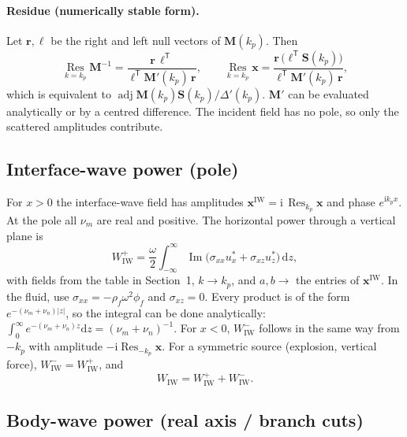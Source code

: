\documentclass[11pt,a4paper]{article}
\newcommand{\ii}{\mathrm{i}}
\newcommand{\dd}{\mathrm{d}}
\newcommand{\Res}{\operatorname*{Res}}
\newcommand{\IM}{\operatorname{Im}}
\begin{document}
\paragraph{Residue (numerically stable form).} Let $\mathbf r,\bm\ell$ be the right and left null
vectors of $\mathbf M(k_p)$. Then
\begin{equation}
  \Res_{k=k_p}\mathbf M^{-1}=\frac{\mathbf r\,\bm\ell^{\mathsf T}}{\bm\ell^{\mathsf T}\mathbf M'(k_p)\,\mathbf r},
  \qquad
  \Res_{k=k_p}\mathbf x=\frac{\mathbf r\,\bigl(\bm\ell^{\mathsf T}\mathbf S(k_p)\bigr)}{\bm\ell^{\mathsf T}\mathbf M'(k_p)\,\mathbf r},
  \label{eq:res}
\end{equation}
which is equivalent to $\operatorname{adj}\mathbf M(k_p)\mathbf S(k_p)/\Delta'(k_p)$. $\mathbf M'$ can be
evaluated analytically or by a centred difference. The incident field has no pole, so only the
scattered amplitudes contribute.

\subsection{Interface-wave power (pole)}

For $x>0$ the interface-wave field has amplitudes
$\mathbf x^{\mathrm{IW}}=\ii\,\Res_{k_p}\mathbf x$ and phase $e^{\ii k_px}$. At the pole all $\nu_m$
are real and positive. The horizontal power through a vertical plane is
\begin{equation}
  W_{\mathrm{IW}}^{+}=\frac{\omega}{2}\int_{-\infty}^{\infty}
  \IM\bigl(\sigma_{xx}u_x^{*}+\sigma_{xz}u_z^{*}\bigr)\,\dd z ,
  \label{eq:WIW}
\end{equation}
with fields from the table in Section~1, $k\to k_p$, and $a,b\to$ the entries of
$\mathbf x^{\mathrm{IW}}$. In the fluid, use $\sigma_{xx}=-\rho_f\omega^2\phi_f$ and
$\sigma_{xz}=0$. Every product is of the form $e^{-(\nu_m+\nu_n)|z|}$, so the integral can be done
analytically: $\int_0^\infty e^{-(\nu_m+\nu_n)z}\dd z=(\nu_m+\nu_n)^{-1}$. For $x<0$,
$W_{\mathrm{IW}}^{-}$ follows in the same way from $-k_p$ with amplitude $-\ii\Res_{-k_p}\mathbf x$. For a
symmetric source (explosion, vertical force), $W_{\mathrm{IW}}^{-}=W_{\mathrm{IW}}^{+}$, and
\begin{equation}
  W_{\mathrm{IW}}=W_{\mathrm{IW}}^{+}+W_{\mathrm{IW}}^{-}.
\end{equation}

\subsection{Body-wave power (real axis / branch cuts)}
\end{document}
